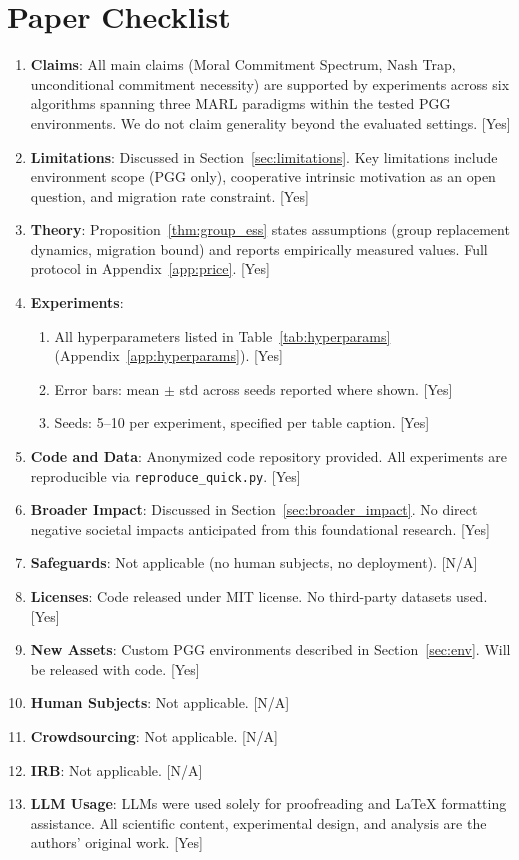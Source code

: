 \documentclass{article}
\begin{document}
\section*{Paper Checklist}

\begin{enumerate}
\item \textbf{Claims}: All main claims (Moral Commitment Spectrum, Nash Trap, unconditional commitment necessity) are supported by experiments across six algorithms spanning three MARL paradigms within the tested PGG environments. We do not claim generality beyond the evaluated settings. [Yes]
\item \textbf{Limitations}: Discussed in Section~\ref{sec:limitations}. Key limitations include environment scope (PGG only), cooperative intrinsic motivation as an open question, and migration rate constraint. [Yes]
\item \textbf{Theory}: Proposition~\ref{thm:group_ess} states assumptions (group replacement dynamics, migration bound) and reports empirically measured values. Full protocol in Appendix~\ref{app:price}. [Yes]
\item \textbf{Experiments}:
  \begin{enumerate}
    \item All hyperparameters listed in Table~\ref{tab:hyperparams} (Appendix~\ref{app:hyperparams}). [Yes]
    \item Error bars: mean $\pm$ std across seeds reported where shown. [Yes]
    \item Seeds: 5--10 per experiment, specified per table caption. [Yes]
  \end{enumerate}
\item \textbf{Code and Data}: Anonymized code repository provided. All experiments are reproducible via \texttt{reproduce\_quick.py}. [Yes]
\item \textbf{Broader Impact}: Discussed in Section~\ref{sec:broader_impact}. No direct negative societal impacts anticipated from this foundational research. [Yes]
\item \textbf{Safeguards}: Not applicable (no human subjects, no deployment). [N/A]
\item \textbf{Licenses}: Code released under MIT license. No third-party datasets used. [Yes]
\item \textbf{New Assets}: Custom PGG environments described in Section~\ref{sec:env}. Will be released with code. [Yes]
\item \textbf{Human Subjects}: Not applicable. [N/A]
\item \textbf{Crowdsourcing}: Not applicable. [N/A]
\item \textbf{IRB}: Not applicable. [N/A]
\item \textbf{LLM Usage}: LLMs were used solely for proofreading and LaTeX formatting assistance. All scientific content, experimental design, and analysis are the authors' original work. [Yes]
\end{enumerate}
\end{document}
